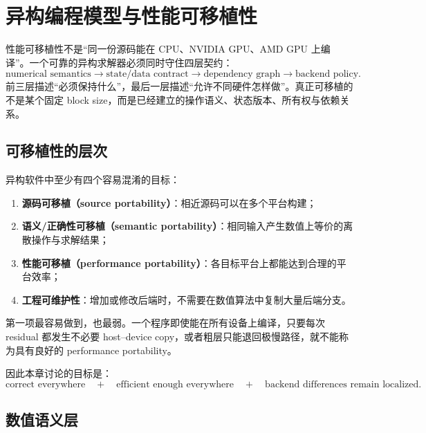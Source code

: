 \chapter{异构编程模型与性能可移植性}
\label{ch:portability}

\begin{keybox}
性能可移植性不是“同一份源码能在 CPU、NVIDIA GPU、AMD GPU 上编译”。一个可靠的异构求解器必须同时守住四层契约：
\begin{equation}
\boxed{
\text{numerical semantics}
\rightarrow
\text{state/data contract}
\rightarrow
\text{dependency graph}
\rightarrow
\text{backend policy}.
}
\label{eq:portability-four-contracts}
\end{equation}
前三层描述“必须保持什么”，最后一层描述“允许不同硬件怎样做”。真正可移植的不是某个固定 block size，而是已经建立的操作语义、状态版本、所有权与依赖关系。
\end{keybox}

\section{可移植性的层次}

异构软件中至少有四个容易混淆的目标：

\begin{enumerate}
\item \textbf{源码可移植（source portability）}：相近源码可以在多个平台构建；
\item \textbf{语义/正确性可移植（semantic portability）}：相同输入产生数值上等价的离散操作与求解结果；
\item \textbf{性能可移植（performance portability）}：各目标平台上都能达到合理的平台效率；
\item \textbf{工程可维护性}：增加或修改后端时，不需要在数值算法中复制大量后端分支。
\end{enumerate}

第一项最容易做到，也最弱。一个程序即使能在所有设备上编译，只要每次 residual 都发生不必要 host--device copy，或者粗层只能退回极慢路径，就不能称为具有良好的 performance portability。

因此本章讨论的目标是：
\begin{equation}
\boxed{
\text{correct everywhere}
\quad+\quad
\text{efficient enough everywhere}
\quad+\quad
\text{backend differences remain localized}.
}
\end{equation}

\section{数值语义层}

